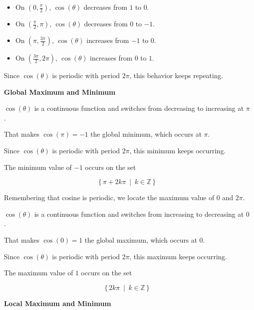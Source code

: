 \documentclass{ximera}
\begin{document}
\begin{itemize}
\item On $\left( 0, \frac{\pi}{2} \right)$, $\cos(\theta)$ decreases from $1$ to $0$.
\item On $\left( \frac{\pi}{2}, \pi \right)$, $\cos(\theta)$ decreases from $0$ to $-1$.
\item On $\left( \pi, \frac{3\pi}{2} \right)$, $\cos(\theta)$ increases from $-1$ to $0$.
\item On $\left( \frac{3\pi}{2}, 2\pi \right)$, $\cos(\theta)$ increases from $0$ to $1$.
\end{itemize}


Since $\cos(\theta)$ is periodic with period $2\pi$, this behavior keeps repeating.





\textbf{\textcolor{blue!55!black}{Global Maximum and Minimum}}



$\cos(\theta)$ is a continuous function and switches from decreasing to increasing at $\pi$.  


That makes $\cos(\pi) = -1$ the global minimum, which occurs at $\pi$.


Since $\cos(\theta)$ is periodic with period $2\pi$, this minimum keeps occurring.


The minimum value of $-1$ occurs on the set 

\[
\{ \, \pi + 2k \pi \, \text{ | } \,  k \in \mathbb{Z} \,  \}
\]





Remembering that cosine is periodic, we locate the maximum value of $0$ and $2\pi$.



$\cos(\theta)$ is a continuous function and switches from increasing to decreasing at $0$.  


That makes $\cos(0) = 1$ the global maximum, which occurs at $0$.




Since $\cos(\theta)$ is periodic with period $2\pi$, this maximum keeps occurring.


The maximum value of $1$ occurs on the set 

\[
\{ \, 2k \pi \, \text{ | } \,  k \in \mathbb{Z} \,  \}
\]








\textbf{\textcolor{blue!55!black}{Local Maximum and Minimum}}
\end{document}
